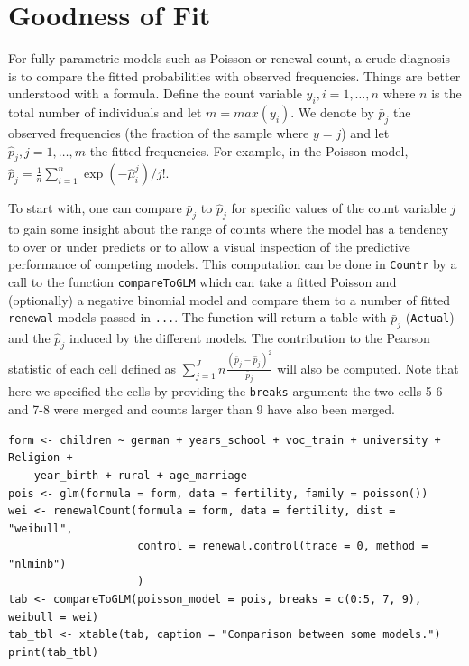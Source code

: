 \documentclass[a4paper,twoside,11pt]{article}
\begin{document}
\section{Goodness of Fit}
\label{sec:org3a46ca5}

For fully parametric models such as Poisson or renewal-count, a crude diagnosis
is to compare the fitted probabilities with observed frequencies. Things are
better understood with a formula. Define the count variable \(y_i, i=1, \dots, n\)
where \(n\) is the total number of individuals and let \(m = max(y_i)\). We denote
by \(\bar{p}_j\) the observed frequencies (the fraction of the sample where \(y =
j\)) and let \(\hat{p}_j, j = 1, \dots, m\) the fitted frequencies. For example, in
the Poisson model, \(\hat{p}_j = \frac{1}{n} \sum_{i=1}^{n} \exp{(-\hat{\mu}_i^j) /
j!}\).

To start with, one can compare \(\bar{p}_j\) to \(\hat{p}_j\) for specific values of
the count variable \(j\) to gain some insight about the range of counts where the
model has a tendency to over or under predicts or to allow a visual inspection
of the predictive performance of competing models. This computation can be done
in \texttt{Countr} by a call to the function \texttt{compareToGLM} which can take a fitted
Poisson and (optionally) a negative binomial model and compare them to a number
of fitted \texttt{renewal} models passed in \texttt{...}. The function will return a table
with \(\bar{p}_j\) (\texttt{Actual}) and the \(\hat{p}_j\) induced by the different
models. The contribution to the Pearson statistic of each cell defined as
\(\sum_{j=1}^J n\frac{(\bar{p}_j - \hat{p}_j)^2}{\bar{p}_j}\) will also be
computed. Note that here we specified the cells by providing the \texttt{breaks}
argument: the two cells 5-6 and 7-8 were merged and counts larger than 9 have
also been merged.

\begin{verbatim}
form <- children ~ german + years_school + voc_train + university + Religion +
    year_birth + rural + age_marriage
pois <- glm(formula = form, data = fertility, family = poisson())
wei <- renewalCount(formula = form, data = fertility, dist = "weibull",
                    control = renewal.control(trace = 0, method = "nlminb")
                    )
tab <- compareToGLM(poisson_model = pois, breaks = c(0:5, 7, 9), weibull = wei)
tab_tbl <- xtable(tab, caption = "Comparison between some models.")
print(tab_tbl)
\end{verbatim}
\end{document}
